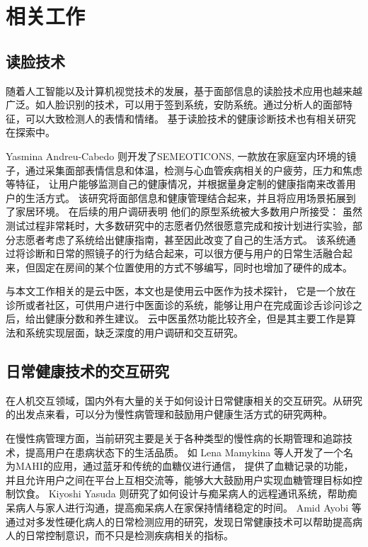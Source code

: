 \chapter{相关工作}

\section{读脸技术}

随着人工智能以及计算机视觉技术的发展，基于面部信息的读脸技术应用也越来越广泛。如人脸识别的技术，可以用于签到系统，安防系统。通过分析人的面部特征，可以大致检测人的表情和情绪。
基于读脸技术的健康诊断技术也有相关研究在探索中。

 Yasmina Andreu-Cabedo  \cite{andreu2015mirror}则开发了SEMEOTICONS, 一款放在家庭室内环境的镜子，通过采集面部表情信息和体温，检测与心血管疾病相关的户疲劳，压力和焦虑等特征， 让用户能够监测自己的健康情况，并根据量身定制的健康指南来改善用户的生活方式。
 该研究将面部信息和健康管理结合起来，并且将应用场景拓展到了家居环境。
 在后续的用户调研表明\cite{coppini2017user} 他们的原型系统被大多数用户所接受： 虽然测试过程非常耗时，大多数研究中的志愿者仍然很愿意完成和按计划进行实验，部分志愿者考虑了系统给出健康指南，甚至因此改变了自己的生活方式。
该系统通过将诊断和日常的照镜子的行为结合起来，可以很方便与用户的日常生活融合起来，但固定在房间的某个位置使用的方式不够编写，同时也增加了硬件的成本。

 与本文工作相关的是云中医\cite{Zhang2018Study}，本文也是使用云中医作为技术探针\cite{Hutchinson2003Technology}， 它是一个放在诊所或者社区，可供用户进行中医面诊的系统，能够让用户在完成面诊舌诊问诊之后，给出健康分数和养生建议。
 云中医虽然功能比较齐全，但是其主要工作是算法和系统实现层面，缺乏深度的用户调研和交互研究。

\section{日常健康技术的交互研究}

在人机交互领域，国内外有大量的关于如何设计日常健康相关的交互研究。从研究的出发点来看，可以分为慢性病管理和鼓励用户健康生活方式的研究两种。

在慢性病管理方面，当前研究主要是关于各种类型的慢性病的长期管理和追踪技术，提高用户在患病状态下的生活品质。
如 Lena Mamykina \cite{mamykina2008mahi:}等人开发了一个名为MAHI的应用，通过蓝牙和传统的血糖仪进行通信，
提供了血糖记录的功能，并且允许用户之间在平台上互相交流等，能够大大鼓励用户实现血糖管理目标如控制饮食。
Kiyoshi Yasuda \cite{yasuda2009remote}则研究了如何设计与痴呆病人的远程通讯系统，帮助痴呆病人与家人进行沟通，提高痴呆病人在家保持情绪稳定的时间。
Amid Ayobi 等\cite{ayobi2017quantifying} 通过对多发性硬化病人的日常检测应用的研究，发现日常健康技术可以帮助提高病人的日常控制意识，而不只是检测疾病相关的指标。

